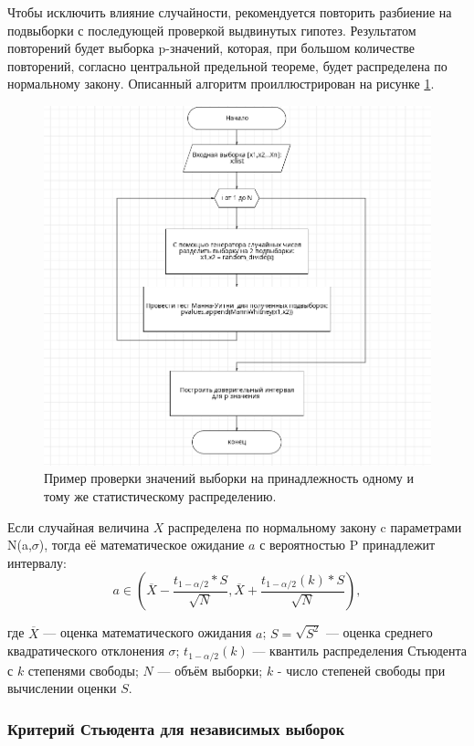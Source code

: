 Чтобы исключить влияние случайности, рекомендуется повторить разбиение на подвыборки с последующей проверкой выдвинутых гипотез. Результатом повторений будет выборка p-значений, которая, при большом количестве повторений, согласно центральной предельной теореме, будет распределена по нормальному закону. Описанный алгоритм проиллюстрирован на рисунке \ref{fig:ris13}.

\begin{figure}[H]
	\centering
	\includegraphics[width=1\linewidth]{pics/ris13} %
	\caption{Пример проверки значений выборки на принадлежность одному и тому же статистическому распределению.~\cite{RD}}
	\label{fig:ris13} %
\end{figure}

Если случайная величина $X$ распределена по нормальному закону c параметрами N(a,$\sigma$), тогда её математическое ожидание $a$ с вероятностью P принадлежит интервалу:
\begin{equation}
	a \in (\overline{X}-\frac{t_{1-\alpha/2}*S}{\sqrt{N}}, \overline{X}+\frac{t_{1-\alpha/2}(k)*S}{\sqrt{N}}), 
\end{equation}

где $\overline{X}$ --- оценка математического ожидания $a$; $S=\sqrt{S^2}$ --- оценка среднего квадратического отклонения $\sigma$; $t_{1-\alpha/2}(k)$ --- квантиль распределения Стьюдента с $k$ степенями свободы; $N$ --- объём выборки; $k$ - число степеней свободы при вычислении оценки $S$.

\subsubsection{Критерий Стьюдента для независимых выборок}




